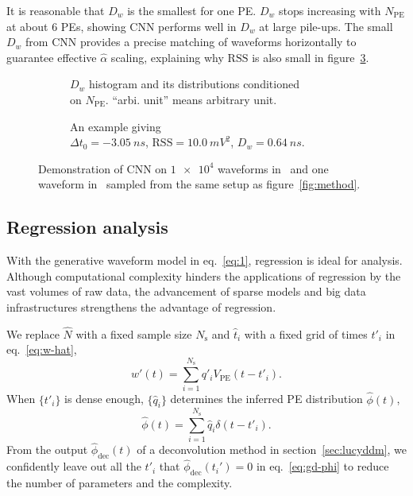 It is reasonable that $D_w$ is the smallest for one PE.  $D_w$ stops increasing with $N_\mathrm{PE}$ at about 6 PEs, showing CNN performs well in $D_w$ at large pile-ups.  The small $D_w$ from CNN provides a precise matching of waveforms horizontally to guarantee effective $\hat{\alpha}$ scaling, explaining why $\mathrm{RSS}$ is also small in figure~\ref{fig:cnn}.

\begin{figure}[H]
  \begin{subfigure}{.5\textwidth}
    \centering
    \resizebox{\textwidth}{!}{}
    \caption{\label{fig:cnn-npe} $D_w$ histogram and its distributions conditioned \\ on $N_{\mathrm{PE}}$. ``arbi. unit'' means arbitrary unit.}
  \end{subfigure}
  \begin{subfigure}{.5\textwidth}
    \centering
    \resizebox{\textwidth}{!}{}
    \caption{\label{fig:cnn}An example giving \\ $\Delta t_0=\SI{-3.05}{ns}$, $\mathrm{RSS}=\SI{10.0}{mV^2}$, $D_w=\SI{0.64}{ns}$.}
  \end{subfigure}
  \caption{Demonstration of CNN on $\num[retain-unity-mantissa=false]{1e4}$ waveforms in~ and one waveform in~ sampled from the same setup as figure~\ref{fig:method}.}
\end{figure}

\subsection{Regression analysis}
\label{sec:regression}
With the generative waveform model in eq.~\eqref{eq:1}, regression is ideal for analysis. Although computational complexity hinders the applications of regression by the vast volumes of raw data, the advancement of sparse models and big data infrastructures strengthens the advantage of regression.

We replace $\hat{N}$ with a fixed sample size $N_\mathrm{s}$ and $\hat{t}_i$ with a fixed grid of times $t'_i$ in eq.~\eqref{eq:w-hat}, 
\begin{equation}
  \label{eq:gd}
  w'(t) = \sum_{i=1}^{N_\mathrm{s}}q'_iV_\mathrm{PE}(t-t'_i).
\end{equation}
When $\{t'_i\}$ is dense enough, $\{\hat{q}_i\}$ determines the inferred PE distribution $\hat{\phi}(t)$,
\begin{equation}
  \label{eq:gd-phi}
  \hat{\phi}(t) = \sum_{i=1}^{N_\mathrm{s}}\hat{q}_i\delta(t-t'_i).
\end{equation}
From the output $\hat{\phi}_\mathrm{dec}(t)$ of a deconvolution method in section~\ref{sec:lucyddm}, we confidently leave out all the $t'_i$ that $\hat{\phi}_\mathrm{dec}(t_i')=0$ in eq.~\eqref{eq:gd-phi} to reduce the number of parameters and the complexity.


